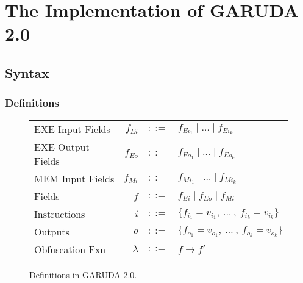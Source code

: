 \documentclass[12pt, letterpaper]{article}
\def \sysname {\textsc{GARUDA 2.0}\xspace}
\begin{document}


  \section{The Implementation of \sysname}\label{sec:spec}

    \subsection{Syntax}\label{sec:spec:synt}
      \subsubsection{Definitions}\label{sec:spec:synt:defn}
        \begin{figure}
          \centering
          \begin{tabular}{l r c l}
            EXE Input Fields  & $f_{Ei}$  & $::=$ & $f_{Ei_{1}} \mid \dots \mid f_{Ei_{k}}$\\
            EXE Output Fields & $f_{Eo}$  & $::=$ & $f_{Eo_{1}} \mid \dots \mid f_{Eo_{k}}$\\
            MEM Input Fields  & $f_{Mi}$  & $::=$ & $f_{Mi_{1}} \mid \dots \mid f_{Mi_{k}}$\\
            Fields            & $f$       & $::=$ & $f_{Ei} \mid f_{Eo} \mid f_{Mi} $ \\
            Instructions      & $i$       & $::=$ & $\{f_{i_{1}} = v_{i_{1}} ,\ \dots\ ,\ f_{i_{k}} = v_{i_{k}}\}$\\
            Outputs           & $o$       & $::=$ & $\{f_{o_{1}} = v_{o_{1}} ,\ \dots\ ,\ f_{o_{k}} = v_{o_{k}}\}$\\
            Obfuscation Fxn   & $\lambda$ & $::=$ & $f \rightarrow f'$
          \end{tabular}
          \caption{Definitions in \sysname.}
          \label{fig:spec:synt:defn}
        \end{figure}
\end{document}
